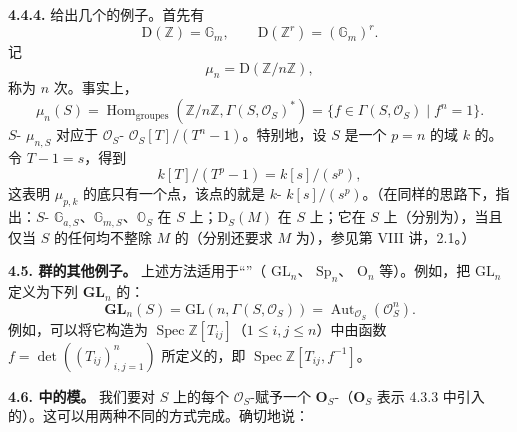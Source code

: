 \textbf{4.4.4.} 给出几个的例子。首先有
\[
\mathrm D(\mathbb Z)=\mathbb G_m,\qquad\mathrm D(\mathbb Z^r)=(\mathbb G_m)^r.
\]
记
\[
\mu_n=\mathrm D(\mathbb Z/n\mathbb Z),
\]
称为 $n$ 次。事实上，
\[
\mu_n(S)=\operatorname{Hom}_{\mathrm{groupes}}(\mathbb Z/n\mathbb Z,\Gamma(S,\mathcal O_S)^*)=\{f\in\Gamma(S,\mathcal O_S)\mid f^n=1\}.
\]
$S$- $\mu_{n,S}$ 对应于 $\mathcal O_S$- $\mathcal O_S[T]/(T^n-1)$。特别地，设 $S$ 是一个 $p=n$ 的域 $k$ 的。令 $T-1=s$，得到
\[
k[T]/(T^p-1)=k[s]/(s^p),
\]
这表明 $\mu_{p,k}$ 的底只有一个点，该点的就是  $k$- $k[s]/(s^p)$。（在同样的思路下，指出：$S$- $\mathbb G_{a,S}$、$\mathbb G_{m,S}$、$\mathbb O_S$ 在 $S$ 上；$\mathrm D_S(M)$ 在 $S$ 上；它在 $S$ 上（分别为），当且仅当 $S$ 的任何均不整除 $M$ 的（分别还要求 $M$ 为），参见第 VIII 讲，2.1。）

\textbf{4.5. 群的其他例子。} 上述方法适用于“”（ $\mathrm{GL}_n$、 $\mathrm{Sp}_n$、 $\mathrm O_n$ 等）。例如，把 $\mathrm{GL}_n$ 定义为下列 $\mathbf{GL}_n$ 的：
\[
\mathbf{GL}_n(S)=\mathrm{GL}(n,\Gamma(S,\mathcal O_S))=\operatorname{Aut}_{\mathcal O_S}(\mathcal O_S^n).
\]
例如，可以将它构造为 $\operatorname{Spec}\mathbb Z[T_{ij}]$（$1\leq i,j\leq n$）中由函数 $f=\det((T_{ij})_{i,j=1}^n)$ 所定义的，即 $\operatorname{Spec}\mathbb Z[T_{ij},f^{-1}]$。

\textbf{4.6. 中的模。} 我们要对 $S$ 上的每个 $\mathcal O_S$-赋予一个 $\mathbf O_S$-（$\mathbf O_S$ 表示 4.3.3 中引入的）。这可以用两种不同的方式完成。确切地说：

